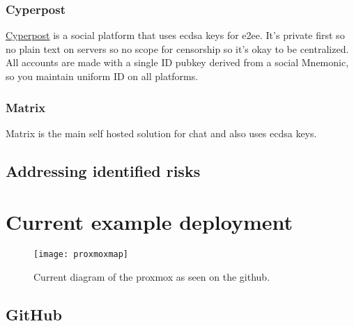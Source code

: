 \subsection{Cyperpost}
\href{https://github.com/i5hi/cypherpost/}{Cyperpost} is a social platform that uses ecdsa keys for e2ee. It's private first so no plain text on servers so no scope for censorship so it's okay to be centralized. All accounts are made with a single ID pubkey derived from a social Mnemonic, so you maintain uniform ID on all platforms.
\subsection{Matrix}
Matrix is the main self hosted solution for chat and also uses ecdsa keys.
\section{Addressing identified risks}
\chapter{Current example deployment }
\lipsum[50]
\begin{figure*}[ht]\centering %
	\texttt{[image: proxmoxmap]}
	\caption{Current diagram of the proxmox as seen on the github.}
	\label{fig:proxmoxmap}
\end{figure*}
\section{GitHub }
\lipsum[50]